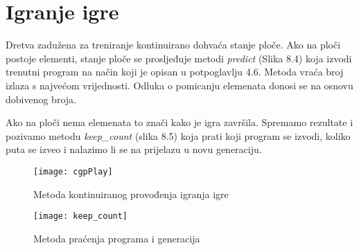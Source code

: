 \section{Igranje igre}
\quad Dretva zadužena za treniranje kontinuirano dohvaća stanje ploče. Ako na ploči postoje elementi, stanje ploče se prosljeđuje metodi \textit{predict} (Slika 8.4) koja izvodi trenutni program na način koji je opisan u potpoglavlju 4.6. Metoda vraća broj izlaza s najvećom vrijednosti. Odluka o pomicanju elemenata donosi se na osnovu dobivenog broja. 
\par
Ako na ploči nema elemenata to znači kako je igra završila. Spremamo rezultate i pozivamo metodu \textit{keep\_count} (slika 8.5) koja prati koji program se izvodi, koliko puta se izveo i nalazimo li se na prijelazu u novu generaciju.
\begin{figure}[h]
	\centering
	\texttt{[image: cgpPlay]}
	\caption{Metoda kontinuiranog provođenja igranja igre}
\end{figure}\newline
\begin{figure}[h]
	\centering
	\texttt{[image: keep\_count]}
	\caption{Metoda praćenja programa i generacija}
\end{figure}\newline
